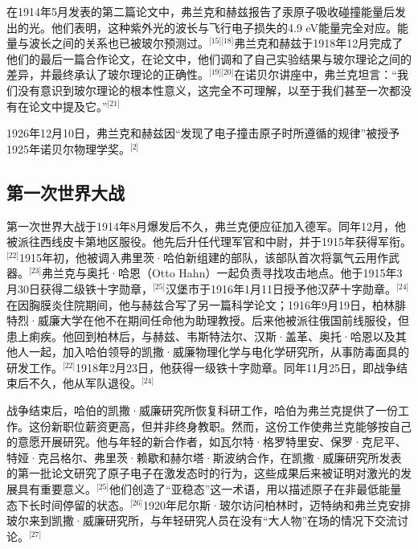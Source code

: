 在1914年5月发表的第二篇论文中，弗兰克和赫兹报告了汞原子吸收碰撞能量后发出的光。他们表明，这种紫外光的波长与飞行电子损失的4.9 eV能量完全对应。能量与波长之间的关系也已被玻尔预测过。\(^\text{[15][18]}\)弗兰克和赫兹于1918年12月完成了他们的最后一篇合作论文，在论文中，他们调和了自己实验结果与玻尔理论之间的差异，并最终承认了玻尔理论的正确性。\(^\text{[19][20]}\)在诺贝尔讲座中，弗兰克坦言：“我们没有意识到玻尔理论的根本性意义，这完全不可理解，以至于我们甚至一次都没有在论文中提及它。”\(^\text{[21]}\)

1926年12月10日，弗兰克和赫兹因“发现了电子撞击原子时所遵循的规律”被授予1925年诺贝尔物理学奖。\(^\text{[2]}\)
\subsection{第一次世界大战}
第一次世界大战于1914年8月爆发后不久，弗兰克便应征加入德军。同年12月，他被派往西线皮卡第地区服役。他先后升任代理军官和中尉，并于1915年获得军衔。\(^\text{[22]}\)1915年初，他被调入弗里茨·哈伯新组建的部队，该部队首次将氯气云用作武器。\(^\text{[23]}\)弗兰克与奥托·哈恩（Otto Hahn）一起负责寻找攻击地点。他于1915年3月30日获得二级铁十字勋章，\(^\text{[25]}\)汉堡市于1916年1月11日授予他汉萨十字勋章。\(^\text{[24]}\)在因胸膜炎住院期间，他与赫兹合写了另一篇科学论文；1916年9月19日，柏林腓特烈·威廉大学在他不在期间任命他为助理教授。后来他被派往俄国前线服役，但患上痢疾。他回到柏林后，与赫兹、韦斯特法尔、汉斯·盖革、奥托·哈恩以及其他人一起，加入哈伯领导的凯撒·威廉物理化学与电化学研究所，从事防毒面具的研发工作。\(^\text{[22]}\)1918年2月23日，他获得一级铁十字勋章。同年11月25日，即战争结束后不久，他从军队退役。\(^\text{[24]}\)

战争结束后，哈伯的凯撒·威廉研究所恢复科研工作，哈伯为弗兰克提供了一份工作。这份新职位薪资更高，但并非终身教职。然而，这份工作使弗兰克能够按自己的意愿开展研究。他与年轻的新合作者，如瓦尔特·格罗特里安、保罗·克尼平、特娅·克吕格尔、弗里茨·赖歇和赫尔塔·斯波纳合作，在凯撒·威廉研究所发表的第一批论文研究了原子电子在激发态时的行为，这些成果后来被证明对激光的发展具有重要意义。\(^\text{[25]}\)他们创造了“亚稳态”这一术语，用以描述原子在非最低能量态下长时间停留的状态。\(^\text{[26]}\)1920年尼尔斯·玻尔访问柏林时，迈特纳和弗兰克安排玻尔来到凯撒·威廉研究所，与年轻研究人员在没有“大人物”在场的情况下交流讨论。\(^\text{[27]}\)

